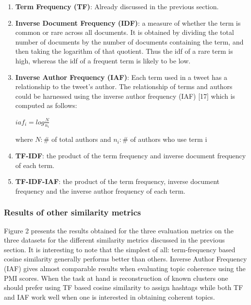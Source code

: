 \documentclass[10pt,a5paper,twoside]{article}
\begin{document}
\begin{enumerate}
\item \textbf{Term Frequency (TF)}: Already discussed in the previous section.
\item \textbf{Inverse Document Frequency (IDF)}:  a measure of whether the term is common or rare across all documents. It is obtained by dividing the total number of documents by the number of documents containing the term, and then taking the logarithm of that quotient. Thus the idf of a rare term is high, whereas the idf of a frequent term is likely to be low.
\item \textbf{Inverse Author Frequency (IAF)}: Each term used in a tweet has a relationship to the tweet's author. The relationship of terms and authors could be harnessed using the inverse author frequency (IAF) [17] which is computed as follows:

\begin{center}
$iaf_i = log \frac{N}{n_i}$
\end{center}
where $N: \#$ of total authors and $n_i: \#$ of authors who use term i

\item \textbf{TF-IDF}: the product of the term frequency and inverse document frequency of each term.
\item \textbf{TF-IDF-IAF}: the product of the term frequency, inverse document frequency and the inverse author frequency of each term.
\end{enumerate}


\subsubsection{Results of other similarity metrics}
Figure 2 presents the results obtained for the three evaluation metrics on the three datasets for the different similarity metrics discussed in the previous section. It is interesting to note that the simplest of all: term-frequency based cosine similarity generally performs better than others. Inverse Author Frequency (IAF) gives almost comparable results when evaluating topic coherence using the PMI scores. When the task at hand is reconstruction of known clusters one should prefer using TF based cosine similarity to assign hashtags while both TF and IAF work well when one is interested in obtaining coherent topics.\\
\end{document}
